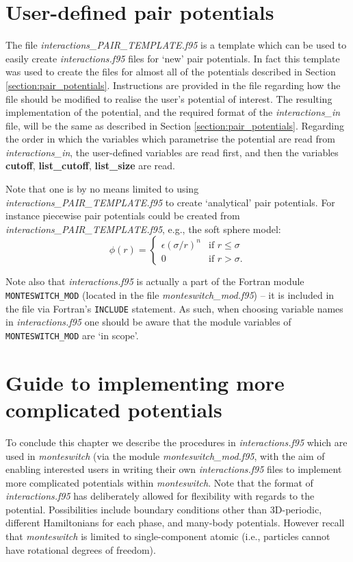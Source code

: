\documentclass{report}
\begin{document}
\section{User-defined pair potentials}\label{sec:user_defined}
The file \emph{interactions\_PAIR\_TEMPLATE.f95} is a template which can be used to easily create \emph{interactions.f95} files for `new'
pair potentials. In fact this template was used to create the files for almost all of the potentials described in Section
\ref{section:pair_potentials}. Instructions are provided in the file regarding how the file should be modified to realise the user's potential
of interest. The resulting implementation of the potential, and the required format of the \emph{interactions\_in} file, will be the same as described 
in Section \ref{section:pair_potentials}. Regarding the order in which the variables which parametrise the potential are read from 
\emph{interactions\_in}, the user-defined variables are read first, and then the variables \textbf{cutoff}, \textbf{list\_cutoff}, 
\textbf{list\_size} are read.

Note that one is by no means limited to using \emph{interactions\_PAIR\_TEMPLATE.f95} to create `analytical' pair potentials. For instance
piecewise pair potentials could be created from \emph{interactions\_PAIR\_TEMPLATE.f95}, e.g., the soft sphere model:
\begin{equation}
\phi(r)=
\begin{cases} 
\epsilon(\sigma/r)^n & \text{if }r\leq\sigma \\
0 & \text{if }r>\sigma.
\end{cases}
\end{equation}

Note also that \emph{interactions.f95} is actually a part of the Fortran module \verb|MONTESWITCH_MOD| (located in the file 
\emph{monteswitch\_mod.f95}) -- it is included in the file via Fortran's \verb|INCLUDE| statement. As such, when choosing variable names
in \emph{interactions.f95} one should be aware that the module variables of \verb|MONTESWITCH_MOD| are `in scope'.


\section{Guide to implementing more complicated potentials}
To conclude this chapter we describe the procedures in \emph{interactions.f95} which are used in \emph{monteswitch} (via the module
\emph{monteswitch\_mod.f95}, with the aim of enabling interested users in writing their own \emph{interactions.f95} files to implement
more complicated potentials within \emph{monteswitch}. Note that the format of \emph{interactions.f95} has deliberately allowed for 
flexibility with regards to the potential. Possibilities include boundary conditions other than 3D-periodic, different Hamiltonians
for each phase, and many-body potentials. However recall that \emph{monteswitch} is limited to single-component atomic (i.e., particles
cannot have rotational degrees of freedom).
\end{document}
